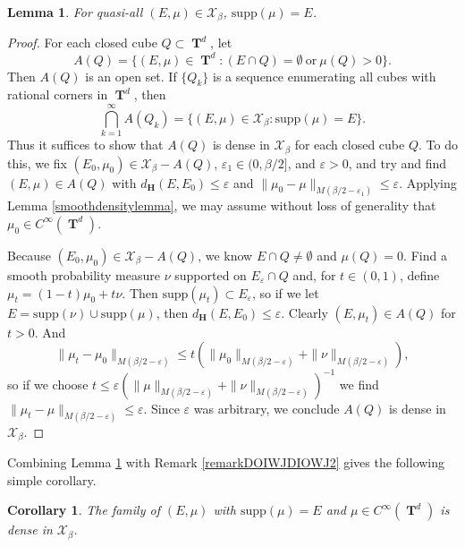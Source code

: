 \documentclass[12pt,reqno]{article}
\numberwithin{equation}{section}
\DeclareMathOperator{\TT}{\mathbf{T}}
\newtheorem{lemma}[theorem]{Lemma}
\newtheorem{corollary}[theorem]{Corollary}
\numberwithin{theorem}{section}
\begin{document}
\begin{lemma} \label{lemmaOIJAWDIOJW23232}
    For quasi-all $(E,\mu) \in \mathcal{X}_\beta$, $\text{supp}(\mu) = E$.
\end{lemma}
\begin{proof}
    For each closed cube $Q \subset \TT^d$, let
    \[ A(Q) = \{ (E,\mu) \in \TT^d: (E \cap Q) = \emptyset\ \text{or}\ \mu(Q) > 0 \}. \]
    Then $A(Q)$ is an open set. If $\{ Q_k \}$ is a sequence enumerating all cubes with rational corners in $\TT^d$, then
    \begin{equation}
        \bigcap_{k = 1}^\infty A(Q_k) = \{ (E,\mu) \in \mathcal{X}_\beta : \text{supp}(\mu) = E \}.
    \end{equation}
    Thus it suffices to show that $A(Q)$ is dense in $\mathcal{X}_\beta$ for each closed cube $Q$. To do this, we fix $(E_0,\mu_0) \in \mathcal{X}_\beta - A(Q)$, $\varepsilon_1 \in (0,\beta/2]$, and $\varepsilon > 0$, and try and find $(E,\mu) \in A(Q)$ with $d_\mathbf{H}(E,E_0) \leq \varepsilon$ and $\| \mu_0 - \mu \|_{M(\beta/2 - \varepsilon_1)} \leq \varepsilon$. Applying Lemma \ref{smoothdensitylemma}, we may assume without loss of generality that $\mu_0 \in C^\infty(\TT^d)$.

    Because $(E_0,\mu_0) \in \mathcal{X}_\beta - A(Q)$, we know $E \cap Q \neq \emptyset$ and $\mu(Q) = 0$. Find a smooth probability measure $\nu$ supported on $E_\varepsilon \cap Q$ and, for $t \in (0,1)$, define $\mu_t = (1 - t) \mu_0 + t \nu$. Then $\text{supp}(\mu_t) \subset E_\varepsilon$, so if we let $E = \text{supp}(\nu) \cup \text{supp}(\mu)$, then $d_\mathbf{H}(E,E_0) \leq \varepsilon$. Clearly $(E,\mu_t) \in A(Q)$ for $t > 0$. And
    \begin{equation}
        \| \mu_t - \mu_0 \|_{M(\beta/2 - \varepsilon)} \leq t \left( \| \mu_0 \|_{M(\beta/2 - \varepsilon)} + \| \nu \|_{M(\beta/2 - \varepsilon)} \right),
    \end{equation}
    so if we choose $t \leq \varepsilon (\| \mu \|_{M(\beta/2 - \varepsilon)} + \| \nu \|_{M(\beta/2 - \varepsilon)})^{-1}$ we find $\| \mu_t - \mu \|_{M(\beta/2 - \varepsilon)} \leq \varepsilon$. Since $\varepsilon$ was arbitrary, we conclude $A(Q)$ is dense in $\mathcal{X}_\beta$.
\end{proof}

Combining Lemma \ref{lemmaOIJAWDIOJW23232} with Remark \ref{remarkDOIWJDIOWJ2} gives the following simple corollary.

\begin{corollary} \label{corollaryOIDJOWIJD2212}
    The family of $(E,\mu)$ with $\text{supp}(\mu) = E$ and $\mu \in C^\infty(\TT^d)$ is dense in $\mathcal{X}_\beta$.
\end{corollary}
\end{document}
